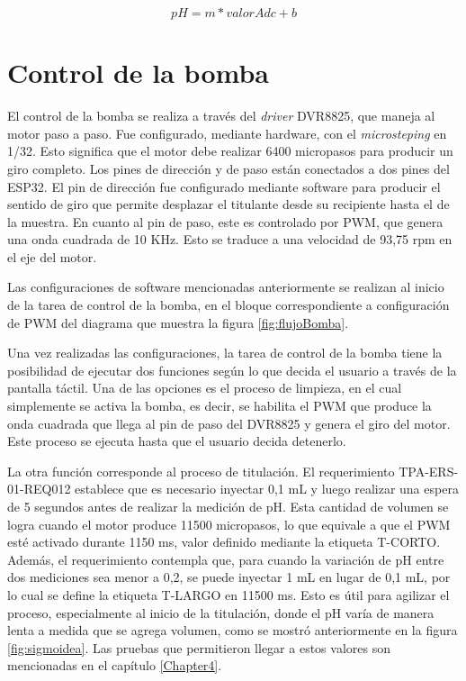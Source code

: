 \begin{equation}
	\label{eq:conversionPh}
pH = m * valorAdc + b
\end{equation}


\section{Control de la bomba}

El control de la bomba se realiza a través del \textit{driver} DVR8825, que maneja al motor paso a paso. Fue configurado, mediante hardware, con el \textit{microsteping} en 1/32. Esto significa que el motor debe realizar 6400 micropasos para producir un giro completo. Los pines de dirección y de paso están conectados a dos pines del ESP32. El pin de dirección fue configurado mediante software para producir el sentido de giro que permite desplazar el titulante desde su recipiente hasta el de la muestra. En cuanto al pin de paso, este es controlado por PWM, que genera una onda cuadrada de 10 KHz. Esto se traduce a una velocidad de 93,75 rpm en el eje del motor.

Las configuraciones de software mencionadas anteriormente se realizan al inicio de la tarea de control de la bomba, en el bloque correspondiente a configuración de PWM del diagrama que muestra la figura \ref{fig:flujoBomba}.

Una vez realizadas las configuraciones, la tarea de control de la bomba tiene la posibilidad de ejecutar dos funciones según lo que decida el usuario a través de la pantalla táctil. Una de las opciones es el proceso de limpieza, en el cual simplemente se activa la bomba, es decir, se habilita el PWM que produce la onda cuadrada que llega al pin de paso del DVR8825 y genera el giro del motor. Este proceso se ejecuta hasta que el usuario decida detenerlo.

La otra función corresponde al proceso de titulación. El requerimiento TPA-ERS-01-REQ012 establece que es necesario inyectar 0,1 mL y luego realizar una espera de 5 segundos antes de realizar la medición de pH. Esta cantidad de volumen se logra cuando el motor produce 11500 micropasos, lo que equivale a que el PWM esté activado durante 1150 ms, valor definido mediante la etiqueta T-CORTO. Además, el requerimiento contempla que, para cuando la variación de pH entre dos mediciones  sea menor a 0,2, se puede inyectar 1 mL en lugar de 0,1 mL, por lo cual se define la etiqueta T-LARGO en 11500 ms. Esto es útil para agilizar el proceso, especialmente al inicio de la titulación, donde el pH varía de manera lenta a medida que se agrega volumen, como se mostró anteriormente en la figura \ref{fig:sigmoidea}. Las pruebas que permitieron llegar a estos valores son mencionadas en el capítulo \ref{Chapter4}.

